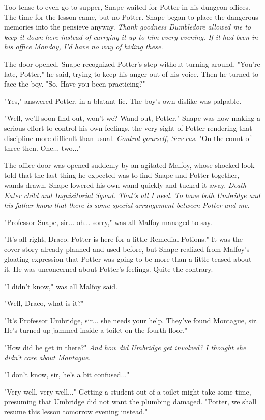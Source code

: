 Too tense to even go to supper, Snape waited for Potter in his dungeon offices. The time for the lesson came, but no Potter. Snape began to place the dangerous memories into the pensieve anyway. \emph{Thank goodness Dumbledore allowed me to keep it down here instead of carrying it up to him every evening. If it had been in his office Monday, I'd have no way of hiding these.}

The door opened. Snape recognized Potter's step without turning around. "You're late, Potter," he said, trying to keep his anger out of his voice. Then he turned to face the boy. "So. Have you been practicing?"

"Yes," answered Potter, in a blatant lie. The boy's own dislike was palpable.

"Well, we'll soon find out, won't we? Wand out, Potter." Snape was now making a serious effort to control his own feelings, the very sight of Potter rendering that discipline more difficult than usual. \emph{Control yourself, Severus}. "On the count of three then. One... two..."

The office door was opened suddenly by an agitated Malfoy, whose shocked look told that the last thing he expected was to find Snape and Potter together, wands drawn. Snape lowered his own wand quickly and tucked it away. \emph{Death Eater child and Inquisitorial Squad. That's all I need. To have both Umbridge and his father know that there is some special arrangement between Potter and me.}

"Professor Snape, sir... oh... sorry," was all Malfoy managed to say.

"It's all right, Draco. Potter is here for a little Remedial Potions." It was the cover story already planned and used before, but Snape realized from Malfoy's gloating expression that Potter was going to be more than a little teased about it. He was unconcerned about Potter's feelings. Quite the contrary.

"I didn't know," was all Malfoy said.

"Well, Draco, what is it?"

"It's Professor Umbridge, sir... she needs your help. They've found Montague, sir. He's turned up jammed inside a toilet on the fourth floor."

"How did he get in there?" \emph{And how did Umbridge get involved? I thought she didn't care about Montague.}

"I don't know, sir, he's a bit confused..."

"Very well, very well..." Getting a student out of a toilet might take some time, presuming that Umbridge did not want the plumbing damaged. "Potter, we shall resume this lesson tomorrow evening instead."

